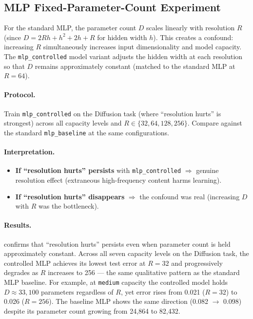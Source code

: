 \documentclass[11pt]{article}
\begin{document}
\subsection{MLP Fixed-Parameter-Count Experiment}
\label{app:mlp-controlled}

For the standard MLP, the parameter count $D$ scales linearly with
resolution $R$ (since $D = 2Rh + h^2 + 2h + R$ for hidden width $h$).
This creates a confound: increasing $R$ simultaneously increases input
dimensionality and model capacity. The \texttt{mlp\_controlled} model
variant adjusts the hidden width at each resolution so that $D$ remains
approximately constant (matched to the standard MLP at $R = 64$).

\paragraph{Protocol.}
Train \texttt{mlp\_controlled} on the Diffusion task (where ``resolution
hurts'' is strongest) across all capacity levels and
$R \in \{32, 64, 128, 256\}$. Compare against the standard
\texttt{mlp\_baseline} at the same configurations.

\paragraph{Interpretation.}
\begin{itemize}
  \item \textbf{If ``resolution hurts'' persists} with
    \texttt{mlp\_controlled} $\Rightarrow$ genuine resolution effect
    (extraneous high-frequency content harms learning).
  \item \textbf{If ``resolution hurts'' disappears} $\Rightarrow$ the
    confound was real (increasing $D$ with $R$ was the bottleneck).
\end{itemize}

\paragraph{Results.}
 confirms that ``resolution hurts'' persists
even when parameter count is held approximately constant.
Across all seven capacity levels on the Diffusion task, the controlled
MLP achieves its lowest test error at $R = 32$ and progressively
degrades as $R$ increases to 256 --- the same qualitative pattern as
the standard MLP baseline. For example, at \texttt{medium} capacity the
controlled model holds $D \approx 33{,}100$ parameters regardless of
$R$, yet error rises from 0.021 ($R = 32$) to 0.026 ($R = 256$). The
baseline MLP shows the same direction (0.082 $\to$ 0.098)
despite its parameter count growing from 24{,}864 to 82{,}432.
\end{document}
